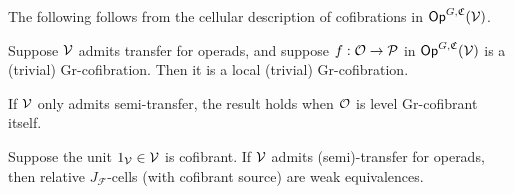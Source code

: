 \documentclass[a4paper,10pt
,draft
]{article}%
\renewcommand{\F}{\mathcal F}
\renewcommand{\1}{\ensuremath{\mathbb{id}}}
\begin{document}
The following follows from the cellular description of cofibrations in $\mathsf{Op}^{G, \mathfrak C}(\mathcal V)$.
\begin{lemma}
      \label{LOCAL_COF_LEM}
      Suppose $\mathcal V$ admits transfer for operads, and suppose
      $f: \mathcal{O} \to \mathcal{P}$ in $\mathsf{Op}^{G, \mathfrak C}(\mathcal V)$ is a (trivial) $\mathrm{Gr}$-cofibration.
      Then it is a local (trivial) $\mathrm{Gr}$-cofibration.

      If $\mathcal V$ only admits semi-transfer, the result holds when $\mathcal{O}$ is level $\mathrm{Gr}$-cofibrant itself.
\end{lemma}

\begin{proposition}
      \label{J-CELL_PROP}
      Suppose the unit $1_{\mathcal V} \in \mathcal V$ is cofibrant.
      If $\mathcal V$ admits (semi)-transfer for operads, then relative $J_{\F}$-cells (with cofibrant source) are weak equivalences.
\end{proposition}
\end{document}
